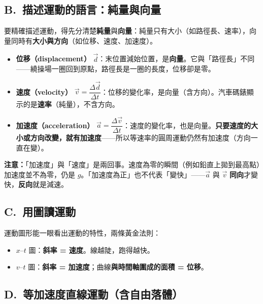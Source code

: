 \documentclass[11pt]{article}
\begin{document}
\subsection*{\sffamily B.\ 描述運動的語言：純量與向量}

要精確描述運動，得先分清楚\textbf{純量}與\textbf{向量}：純量只有大小（如路徑長、速率），向量同時有\textbf{大小與方向}（如位移、速度、加速度）。

\begin{itemize}\setlength{\itemsep}{1pt}
\item \textbf{位移（displacement）} $\vec{d}$：末位置減始位置，是\textbf{向量}。它與「路徑長」不同——繞操場一圈回到原點，路徑長是一圈的長度，位移卻是零。
\item \textbf{速度（velocity）} $\vec{v}=\dfrac{\Delta \vec{d}}{\Delta t}$：位移的變化率，是向量（含方向）。汽車碼錶顯示的是\textbf{速率}（純量），不含方向。
\item \textbf{加速度（acceleration）} $\vec{a}=\dfrac{\Delta \vec{v}}{\Delta t}$：速度的變化率，也是向量。\textbf{只要速度的大小或方向改變，就有加速度}——所以等速率的圓周運動仍然有加速度（方向一直在變）。
\end{itemize}

\textbf{注意：}「加速度」與「速度」是兩回事。速度為零的瞬間（例如鉛直上拋到最高點）加速度並不為零，仍是 $g$。「加速度為正」也不代表「變快」——$\vec{a}$ 與 $\vec{v}$ \textbf{同向}才變快，\textbf{反向}就是減速。

\subsection*{\sffamily C.\ 用圖讀運動}

運動圖形能一眼看出運動的特性，兩條黃金法則：


\begin{itemize}\setlength{\itemsep}{1pt}
\item $x$–$t$ 圖：\textbf{斜率 = 速度}。線越陡，跑得越快。
\item $v$–$t$ 圖：\textbf{斜率 = 加速度}；曲線\textbf{與時間軸圍成的面積 = 位移}。
\end{itemize}

\subsection*{\sffamily D.\ 等加速度直線運動（含自由落體）}
\end{document}
